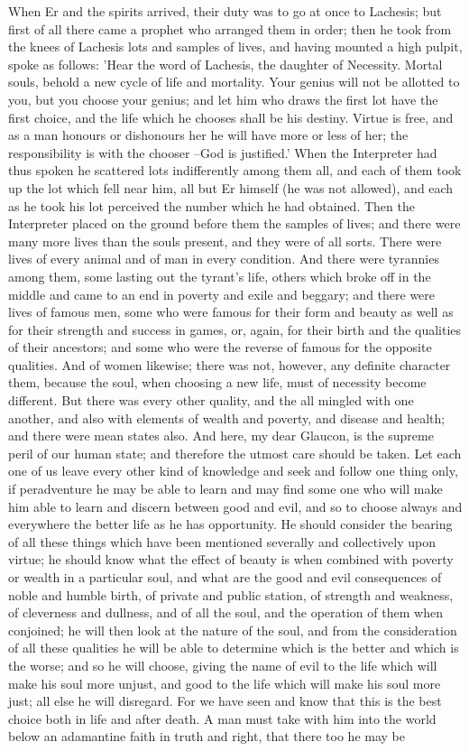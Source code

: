 When Er and the spirits arrived, their duty was to go at once to Lachesis; but first of all there came a prophet who arranged them in order; then he took from the knees of Lachesis lots and samples of lives, and having mounted a high pulpit, spoke as follows: 'Hear the word of Lachesis, the daughter of Necessity. Mortal souls, behold a new cycle of life and mortality. Your genius will not be allotted to you, but you choose your genius; and let him who draws the first lot have the first choice, and the life which he chooses shall be his destiny. Virtue is free, and as a man honours or dishonours her he will have more or less of her; the responsibility is with the chooser --God is justified.' When the Interpreter had thus spoken he scattered lots indifferently among them all, and each of them took up the lot which fell near him, all but Er himself (he was not allowed), and each as he took his lot perceived the number which he had obtained. Then the Interpreter placed on the ground before them the samples of lives; and there were many more lives than the souls present, and they were of all sorts. There were lives of every animal and of man in every condition. And there were tyrannies among them, some lasting out the tyrant's life, others which broke off in the middle and came to an end in poverty and exile and beggary; and there were lives of famous men, some who were famous for their form and beauty as well as for their strength and success in games, or, again, for their birth and the qualities of their ancestors; and some who were the reverse of famous for the opposite qualities. And of women likewise; there was not, however, any definite character them, because the soul, when choosing a new life, must of necessity become different. But there was every other quality, and the all mingled with one another, and also with elements of wealth and poverty, and disease and health; and there were mean states also. And here, my dear Glaucon, is the supreme peril of our human state; and therefore the utmost care should be taken. Let each one of us leave every other kind of knowledge and seek and follow one thing only, if peradventure he may be able to learn and may find some one who will make him able to learn and discern between good and evil, and so to choose always and everywhere the better life as he has opportunity. He should consider the bearing of all these things which have been mentioned severally and collectively upon virtue; he should know what the effect of beauty is when combined with poverty or wealth in a particular soul, and what are the good and evil consequences of noble and humble birth, of private and public station, of strength and weakness, of cleverness and dullness, and of all the soul, and the operation of them when conjoined; he will then look at the nature of the soul, and from the consideration of all these qualities he will be able to determine which is the better and which is the worse; and so he will choose, giving the name of evil to the life which will make his soul more unjust, and good to the life which will make his soul more just; all else he will disregard. For we have seen and know that this is the best choice both in life and after death. A man must take with him into the world below an adamantine faith in truth and right, that there too he may be 